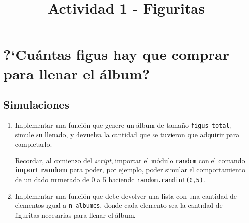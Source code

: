 \documentclass[a4paper,11pt]{article}
\title{Actividad 1 - Figuritas }
\begin{document}
	\maketitle
	\section*{?`Cu\'antas figus hay que comprar para llenar el \'album?}
	\subsection*{Simulaciones}

	\begin{enumerate}
		\item Implementar una funci\'on  que genere un \'album de tama\~no \lstinline{figus_total}, 
		simule su llenado, y devuelva la cantidad \fi que se tuvieron que adquirir para completarlo.
	
		Recordar, al comienzo del \textit{script}, importar el m\'odulo \texttt{random} con el comando \textbf{import random} para poder, por ejemplo, poder simular el comportamiento de un dado numerado de 0 a 5 haciendo \lstinline{random.randint(0,5)}.
			\item Implementar una funci\'on que debe devolver una lista con una cantidad de elementos igual a \lstinline{n_albumes}, donde cada elemento sea la cantidad de figuritas 
		necesarias para llenar el álbum\fi.
		\fi
	\end{enumerate}
\end{document}
